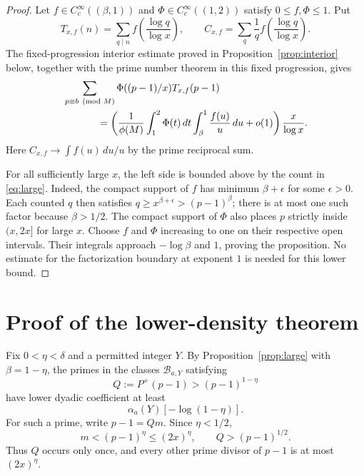 \documentclass[11pt]{article}
\theoremstyle{remark}
\newcommand{\1}{\mathbf 1}
\newcommand{\B}{\mathcal B}
\begin{document}
\begin{proof}
Let $f\in C_c^\infty((\beta,1))$ and
$\Phi\in C_c^\infty((1,2))$ satisfy $0\le f,\Phi\le1$.
Put
\[
 T_{x,f}(n)=\sum_{q\mid n}f\!\left(\frac{\log q}{\log x}\right),
 \qquad
 C_{x,f}=\sum_q\frac1q
                 f\!\left(\frac{\log q}{\log x}\right).
\]
The fixed-progression interior estimate proved in
Proposition~\ref{prop:interior} below, together with the prime
number theorem in this fixed progression, gives
\begin{align*}
 &\sum_{\substack{p\equiv b\pmod M}}
     \Phi((p-1)/x)T_{x,f}(p-1)\\
 &\hspace{12mm}=
 \left(\frac1{\phi(M)}\int_1^2\Phi(t)\,dt
              \int_\beta^1\frac{f(u)}u\,du+o(1)\right)
 \frac{x}{\log x}.
\end{align*}
Here $C_{x,f}\to\int f(u)\,du/u$ by the prime reciprocal sum.

For all sufficiently large $x$, the left side is bounded above
by the count in \eqref{eq:large}.  Indeed, the compact support
of $f$ has minimum $\beta+\epsilon$ for some $\epsilon>0$.
Each counted $q$ then satisfies
$q\ge x^{\beta+\epsilon}>(p-1)^\beta$; there is at most one
such factor because $\beta>1/2$.  The compact support of $\Phi$
also places $p$ strictly inside $(x,2x]$ for large $x$.
Choose $f$ and $\Phi$ increasing to one on their respective open
intervals.  Their integrals approach $-\log\beta$ and $1$,
proving the proposition.  No estimate for the factorization
boundary at exponent $1$ is needed for this lower bound.
\end{proof}

\section{Proof of the lower-density theorem}\label{sec:proof}

Fix $0<\eta<\delta$ and a permitted integer $Y$.
By Proposition~\ref{prop:large} with $\beta=1-\eta$, the primes
in the classes $\B_{a,Y}$ satisfying
\begin{equation}\label{eq:candidate}
 Q:=P^+(p-1)>(p-1)^{1-\eta}
\end{equation}
have lower dyadic coefficient at least
\begin{equation}\label{eq:candidate-mass}
 \alpha_a(Y)[-\log(1-\eta)].
\end{equation}
For such a prime, write $p-1=Qm$.  Since $\eta<1/2$,
\begin{equation}\label{eq:cofactor}
 m<(p-1)^\eta\le(2x)^\eta,
 \qquad Q>(p-1)^{1/2}.
\end{equation}
Thus $Q$ occurs only once, and every other prime divisor of
$p-1$ is at most $(2x)^\eta$.
\end{document}
